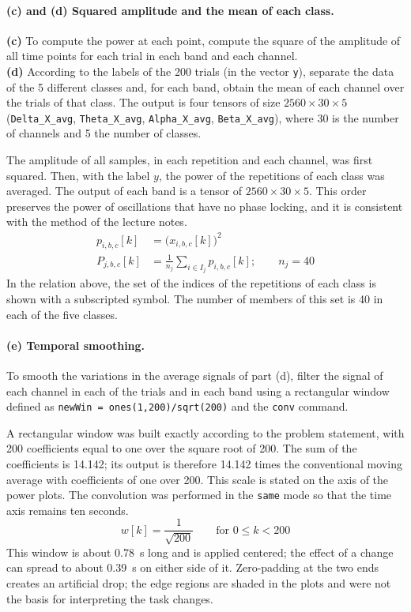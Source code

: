 \paragraph{(c) and (d) Squared amplitude and the mean of each class.}
\begin{taskbox}
\textbf{(c)} To compute the power at each point, compute the square of the amplitude of all time points for each trial in each band and each channel.\\
\textbf{(d)} According to the labels of the 200 trials (in the vector \texttt{y}), separate the data of the 5 different classes and, for each band, obtain the mean of each channel over the trials of that class. The output is four tensors of size $2560\times30\times5$ (\texttt{Delta\_X\_avg}, \texttt{Theta\_X\_avg}, \texttt{Alpha\_X\_avg}, \texttt{Beta\_X\_avg}), where 30 is the number of channels and 5 the number of classes.
\end{taskbox}
The amplitude of all samples, in each repetition and each channel, was first squared. Then, with the label $y$, the power of the repetitions of each class was averaged. The output of each band is a tensor of $2560\times30\times5$. This order preserves the power of oscillations that have no phase locking, and it is consistent with the method of the lecture notes.
\begin{align}
p_{i,b,c}[k]&=\bigl(x_{i,b,c}[k]\bigr)^{2}\\
P_{j,b,c}[k]&=\frac{1}{n_j}\sum_{i\in I_j}p_{i,b,c}[k];\qquad n_j=40
\end{align}
In the relation above, the set of the indices of the repetitions of each class is shown with a subscripted symbol. The number of members of this set is 40 in each of the five classes.

\paragraph{(e) Temporal smoothing.}
\begin{taskbox}
To smooth the variations in the average signals of part (d), filter the signal of each channel in each of the trials and in each band using a rectangular window defined as \texttt{newWin = ones(1,200)/sqrt(200)} and the \texttt{conv} command.
\end{taskbox}
A rectangular window was built exactly according to the problem statement, with 200 coefficients equal to one over the square root of 200. The sum of the coefficients is 14.142; its output is therefore 14.142 times the conventional moving average with coefficients of one over 200. This scale is stated on the axis of the power plots. The convolution was performed in the \texttt{same} mode so that the time axis remains ten seconds.
\begin{equation}
w[k]=\frac{1}{\sqrt{200}}\qquad\text{for } 0\le k<200
\end{equation}
This window is about 0.78~s long and is applied centered; the effect of a change can spread to about 0.39~s on either side of it. Zero-padding at the two ends creates an artificial drop; the edge regions are shaded in the plots and were not the basis for interpreting the task changes.

